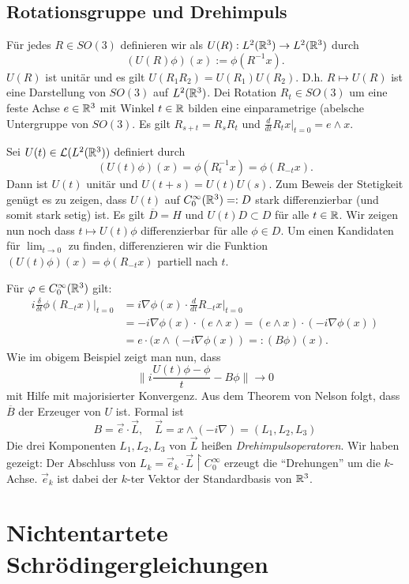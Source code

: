 \documentclass{mycourse}
\begin{document}
\section{Rotationsgruppe und Drehimpuls}
Für jedes $R\in SO(3)$ definieren wir als $U(R): L^2(\mathbb{R}^3) \to L^2(\mathbb{R}^3)$ durch
\[
(U(R)\phi)(x):= \phi(R^{-1}x).
\]
$U(R)$ ist unitär und es gilt  $U(R_1 R_2)=U(R_1) U(R_2)$. D.h. $R\mapsto U(R)$ ist eine Darstellung von $SO(3)$ auf $L^2(\mathbb{R}^3)$. Dei Rotation $R_t\in SO(3)$ um eine feste Achse $e\in \mathbb{R}^3$ mit Winkel $t\in \mathbb{R}$ bilden eine einparametrige (abelsche Untergruppe von $SO(3)$. Es gilt $R_{s+t}=R_s R_t$ und $\frac{d}{dt} R_t x|_{t=0}=e \land x$. 

Sei $U(t)\in \mathcal L(L^2(\mathbb{R}^3))$ definiert durch
\[
(U(t)\phi)(x)=\phi(R_t^{-1}x)=\phi(R_{-t} x).
\]
Dann ist $U(t)$ unitär und $U(t+s)=U(t) U(s)$. Zum Beweis der Stetigkeit genügt es zu zeigen, dass $U(t)$ auf $C_0^\infty (\mathbb{R}^3)=:D$ stark differenzierbar (und somit stark setig) ist. Es gilt $\overline{D}=H$ und $U(t)D\subset D$ für alle $t\in \mathbb{R}$. Wir zeigen nun noch dass $t\mapsto U(t)\phi$ differenzierbar für alle $\phi\in D$. Um einen Kandidaten für $\lim_{t\to 0}$ zu finden, differenzieren wir die Funktion $(U(t)\phi)(x)=\phi(R_{-t} x)$ partiell nach $t$. 

Für $\varphi\in C_0^\infty(\mathbb{R}^3)$ gilt:
\begin{align*}
i \frac{\delta}{\delta t} \phi(R_{-t}x)|_{t=0} &= i \nabla \phi(x) \cdot \frac{d}{dt} R_{-t} x|_{t=0}\\
&=-i \nabla \phi(x) \cdot (e \land x) = (e\land x) \cdot (-i \nabla \phi(x))\\&= e\cdot (x \land(-i \nabla \phi(x)) =: (B\phi)(x).
\end{align*}
Wie im obigem Beispiel zeigt man  nun, dass 
\[
\|i \frac{U(t)\phi- \phi}{t} - B\phi\| \to 0
\]
mit Hilfe mit majorisierter Konvergenz. Aus dem Theorem von Nelson folgt, dass $\overline{B}$ der Erzeuger von $U$ ist. Formal ist
\[
B=\vec e \cdot \vec L, \quad \vec L=x \land (-i \nabla) =(L_1, L_2, L_3)
\]
Die drei Komponenten $L_1, L_2, L_3$ von $\vec L$ heißen \emph{Drehimpulsoperatoren}. Wir haben gezeigt: Der Abschluss von $L_k=\vec e_k \cdot \vec L \upharpoonright C_0^\infty$ erzeugt die "`Drehungen"' um die $k$-Achse. $\vec e_k$ ist dabei der $k$-ter Vektor der Standardbasis von $\mathbb{R}^3$.

\chapter{Nichtentartete Schrödingergleichungen}
\end{document}
